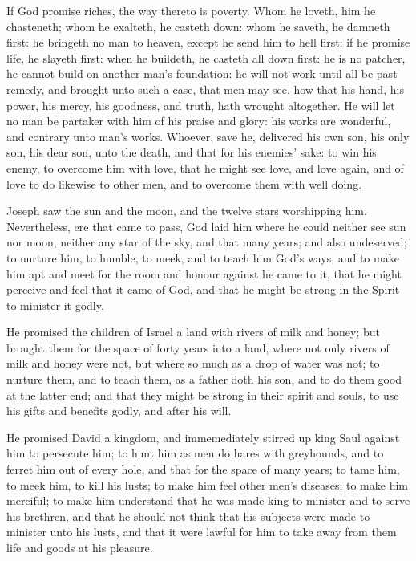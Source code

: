 If God promise riches, the way thereto is poverty.
Whom he loveth, him he chasteneth;
whom he exalteth, he casteth down: whom he 
saveth, he damneth first: he bringeth no man to 
heaven, except he send him to hell first: if he 
promise life, he slayeth first: when he buildeth,
he casteth all down first: he is no patcher, 
he cannot build on another man's foundation:
he will not work until all be past remedy, and 
brought unto such a case, that men may see, how 
that his hand, his power, his mercy, his goodness, 
and truth, hath wrought altogether. He will let no 
man be partaker with him of his praise and glory:
his works are wonderful, and contrary unto man's 
works. Whoever, save he, delivered his own 
son, his only son, his dear son, unto the death, 
and that for his enemies' sake: to win his enemy, 
to overcome him with love, that he might see 
love, and love again, and of love to do likewise to 
other men, and to overcome them with well doing. 



Joseph saw the sun and the moon, and the 
twelve stars worshipping him. Nevertheless, 
ere that came to pass, God laid him where he 
could neither see sun nor moon, neither any star 
of the sky, and that many years; and also undeserved;
to nurture him, to humble, to meek, and
to teach him God's ways, and to make him apt 
and meet for the room and honour against he 
came to it, that he might perceive and feel that 
it came of God, and that he might be strong in 
the Spirit to minister it godly. 

He promised the children of Israel a land 
with rivers of milk and honey; but brought them 
for the space of forty years into a land, where 
not only rivers of milk and honey were not, but 
where so much as a drop of water was not; to 
nurture them, and to teach them, as a father 
doth his son, and to do them good at the latter 
end; and that they might be strong in their 
spirit and souls, to use his gifts and benefits 
godly, and after his will.

He promised David a kingdom, and immemediately
stirred up king Saul against him to 
persecute him; to hunt him as men do hares 
with greyhounds, and to ferret him out of every 
hole, and that for the space of many years; to 
tame him, to meek him, to kill his lusts; to make 
him feel other men's diseases; to make him merciful;
to make him understand that he was made 
king to minister and to serve his brethren, and 
that he should not think that his subjects were 
made to minister unto his lusts, and that it were 
lawful for him to take away from them life and 
goods at his pleasure.

